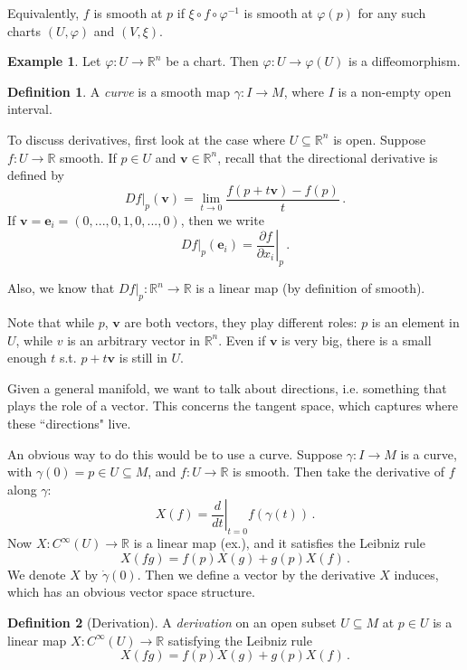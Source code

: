 \documentclass[a4paper,11pt]{article}
\theoremstyle{definition}
\newtheorem*{defn}{Definition}
\newtheorem*{ex}{Example}
\numberwithin{equation}{section}
\begin{document}
Equivalently, $f$ is smooth at $p$ if $\xi\circ f\circ\varphi^{-1}$ is smooth at $\varphi(p)$ for any such charts $(U,\varphi)$ and $(V,\xi)$.

\begin{ex}
Let $\varphi:U\rightarrow\mathbb{R}^n$ be a chart. Then $\varphi:U\rightarrow\varphi(U)$ is a diffeomorphism.
\end{ex}

\begin{defn}
A \emph{curve} is a smooth map $\gamma:I\rightarrow M$, where $I$ is a non-empty open interval.
\end{defn}

To discuss derivatives, first look at the case where $U\subseteq\mathbb{R}^n$ is open. Suppose $f:U\rightarrow\mathbb{R}$ smooth. If $p\in U$ and $\mathbf{v}\in\mathbb{R}^n$, recall that the directional derivative is defined by
\[
Df|_p(\mathbf{v})=\lim_{t\rightarrow0}\frac{f(p+t\mathbf{v})-f(p)}{t}\,.
\]
If $\mathbf{v}=\mathbf{e}_i=(0,...,0,1,0,...,0)$, then we write 
\[
Df|_p(\mathbf{e}_i)=\left.\frac{\partial f}{\partial x_i}\right|_p\,.
\]

Also, we know that $Df|_p:\mathbb{R}^n\rightarrow\mathbb{R}$ is a linear map (by definition of smooth).

Note that while $p$, $\mathbf{v}$ are both vectors, they play different roles: $p$ is an element in $U$, while $v$ is an arbitrary vector in $\mathbb{R}^n$. Even if $\mathbf{v}$ is very big, there is a small enough $t$ s.t. $p+t\mathbf{v}$ is still in $U$.

Given a general manifold, we want to talk about directions, i.e. something that plays the role of a vector. This concerns the tangent space, which captures where these ``directions" live.

An obvious way to do this would be to use a curve. Suppose $\gamma:I\rightarrow M$ is a curve, with $\gamma(0)=p\in U\subseteq M$, and $f:U\rightarrow\mathbb{R}$ is smooth. Then take the derivative of $f$ along $\gamma$:
\[
X(f)=\left.\frac{d}{dt}\right|_{t=0}f(\gamma(t))\,.
\]
Now $X:C^\infty(U)\rightarrow\mathbb{R}$ is a linear map (ex.), and it satisfies the Leibniz rule 
\[
X(fg)=f(p)X(g)+g(p)X(f)\,.
\]
We denote $X$ by $\dot{\gamma}(0)$. Then we define a vector by the derivative $X$ induces, which has an obvious vector space structure.

\begin{defn}[Derivation]
A \emph{derivation} on an open subset $U\subseteq M$ at $p\in U$ is a linear map $X:C^\infty(U)\rightarrow\mathbb{R}$ satisfying the Leibniz rule
\[
X(fg)=f(p)X(g)+g(p)X(f)\,.
\]
\end{defn}
\end{document}
